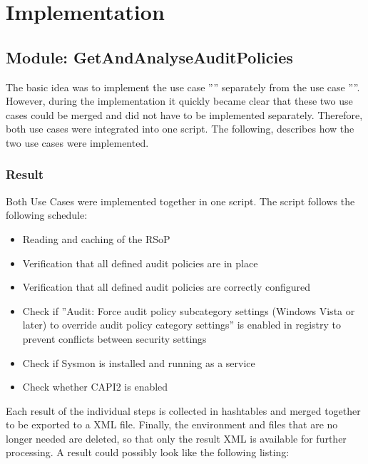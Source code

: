 \section{Implementation}

\subsection{Module: GetAndAnalyseAuditPolicies}
The basic idea was to implement the use case '''' separately from the use case ''''. However, during the implementation it quickly became clear that these two use cases could be merged and did not have to be implemented separately. Therefore, both use cases were integrated into one script. The following, describes how the two use cases were implemented.

\subsubsection{Result}\label{GetAndAnalyseAuditPoliciesResult}
Both Use Cases were implemented together in one script. The script follows the following schedule:
\begin{itemize}
    \item Reading and caching of the RSoP
    \item Verification that all defined audit policies are in place
    \item Verification that all defined audit policies are correctly configured
    \item Check if ''Audit: Force audit policy subcategory settings (Windows Vista or later) to override audit policy category settings'' is enabled in registry to prevent conflicts between security settings
    \item Check if Sysmon is installed and running as a service
    \item Check whether CAPI2 is enabled
\end{itemize}
Each result of the individual steps is collected in hashtables and merged together to be exported to a XML file. Finally, the environment and files that are no longer needed are deleted, so that only the result XML is available for further processing. A result could possibly look like the following listing:
